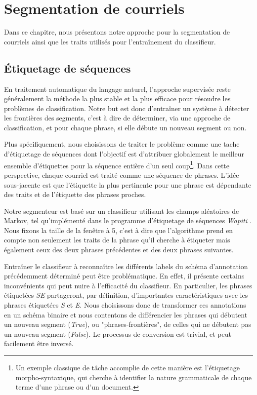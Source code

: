 
\chapter{Segmentation de courriels}

\label{ch:methodology_for_email_segmentation}

Dans ce chapitre, nous présentons notre approche pour la segmentation de courriels ainsi que les traits utilisés pour l’entraînement du classifieur.

\section{Étiquetage de séquences}

En traitement automatique du langage naturel, l'approche supervisée reste généralement la méthode la plus stable et la plus efficace pour résoudre les problèmes de classification. Notre but est donc d'entraîner un système à détecter les frontières des segments, c'est à dire de déterminer, via une approche de classification, et pour chaque phrase, si elle débute un nouveau segment ou non.

Plus spécifiquement, nous choisissons de traiter le problème comme une tache d'étiquetage de séquences dont l'objectif est d'attribuer globalement le meilleur ensemble d'étiquettes pour la séquence entière d'un seul coup\footnote{Un exemple classique de tâche accomplie de cette manière est l'étiquetage morpho-syntaxique, qui cherche à identifier la nature grammaticale de chaque terme d'une phrase ou d'un document.}. Dans cette perspective, chaque courriel est traité comme une séquence de phrases. L'idée sous-jacente est que l'étiquette la plus pertinente pour une phrase est dépendante des traits et de l'étiquette des phrases proches. 

Notre segmenteur est basé sur un classifieur utilisant les champs aléatoires de Markov, tel qu'implémenté dans le programme d'étiquetage de séquences \textit{Wapiti} \cite{lavergne2010practical}. Nous fixons la taille de la fenêtre à 5, c'est à dire que l'algorithme prend en compte non seulement les traits de la phrase qu'il cherche à étiqueter mais également ceux des deux phrases précédentes et des deux phrases suivantes.

Entraîner le classifieur à reconnaître les différents labels du schéma d'annotation précédemment déterminé peut être problématique. En effet, il présente certains inconvénients qui peut nuire à l'efficacité du classifieur. En particulier, les phrases étiquetées \textit{SE} partageront, par définition, d'importantes caractéristiques avec les phrases étiquetées \textit{S} et \textit{E}. Nous choisissons donc de transformer ces annotations en un schéma binaire et nous contentons de différencier les phrases qui débutent un nouveau segment (\textit{True}), ou "phrases-frontières", de celles qui ne débutent pas un nouveau segment (\textit{False}). Le processus de conversion est trivial, et peut facilement être inversé.

